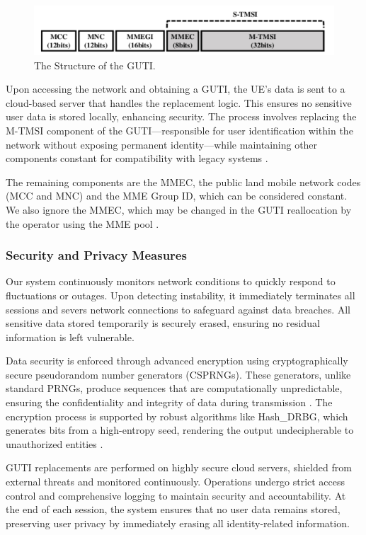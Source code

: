 \documentclass[sigplan,screen]{acmart}
\begin{document}
\begin{figure}[htbp]
\centering
\includegraphics[width=\linewidth]{gutiStructure.png}
\caption{The Structure of the GUTI.}
\end{figure}

Upon accessing the network and obtaining a GUTI, the UE’s data is sent to a cloud-based server that handles the replacement logic. This ensures no sensitive user data is stored locally, enhancing security. The process involves replacing the M-TMSI component of the GUTI—responsible for user identification within the network without exposing permanent identity—while maintaining other components constant for compatibility with legacy systems \cite{3gpp23003}.

The remaining components are the MMEC, the public land mobile network codes (MCC and MNC) and the MME Group ID, which can be considered constant. We also ignore the MMEC, which may be changed in the GUTI reallocation by the operator using the MME pool \cite{hong2018guti}.

\subsubsection{Security and Privacy Measures}
Our system continuously monitors network conditions to quickly respond to fluctuations or outages. Upon detecting instability, it immediately terminates all sessions and severs network connections to safeguard against data breaches. All sensitive data stored temporarily is securely erased, ensuring no residual information is left vulnerable.

Data security is enforced through advanced encryption using cryptographically secure pseudorandom number generators (CSPRNGs). These generators, unlike standard PRNGs, produce sequences that are computationally unpredictable, ensuring the confidentiality and integrity of data during transmission \cite{soto1999statistical}. The encryption process is supported by robust algorithms like Hash\_DRBG, which generates bits from a high-entropy seed, rendering the output undecipherable to unauthorized entities \cite{barker2016nist}.

GUTI replacements are performed on highly secure cloud servers, shielded from external threats and monitored continuously. Operations undergo strict access control and comprehensive logging to maintain security and accountability. At the end of each session, the system ensures that no user data remains stored, preserving user privacy by immediately erasing all identity-related information.
\end{document}
